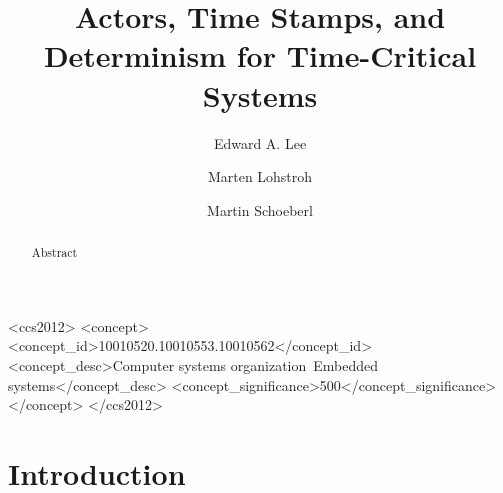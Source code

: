\documentclass[sigconf]{acmart}
\begin{document}
\title{Actors, Time Stamps, and Determinism for Time-Critical Systems}

\author{Edward A. Lee}

\author{Marten Lohstroh}

\author{Martin Schoeberl}


\renewcommand{\shortauthors}{E. A. Lee et al.}

\begin{abstract}
Abstract
\end{abstract}

%
%
\begin{CCSXML}
	<ccs2012>
	<concept>
	<concept_id>10010520.10010553.10010562</concept_id>
	<concept_desc>Computer systems organization~Embedded systems</concept_desc>
	<concept_significance>500</concept_significance>
	</concept>
	</ccs2012>  
\end{CCSXML}



%




\maketitle 

\section{Introduction}
\label{sec:intro}



\end{document}

